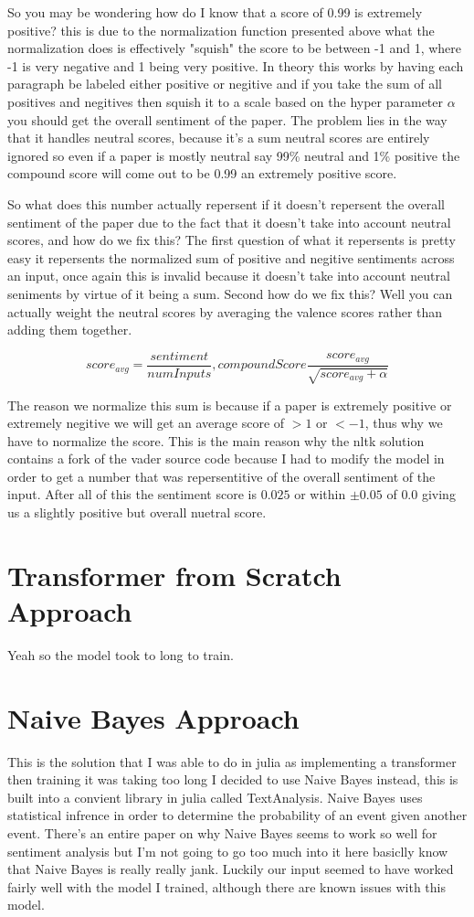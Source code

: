 \documentclass[12pt]{article}
\begin{document}
So you may be wondering how do I know that a score of 0.99 is extremely positive?
this is due to the normalization function presented above what the normalization
does is effectively "squish" the score to be between -1 and 1, where -1 is very 
negative and 1 being very positive. In theory this works by having each paragraph
be labeled either positive or negitive and if you take the sum of all positives and
negitives then squish it to a scale based on the hyper parameter $\alpha$ you
should get the overall sentiment of the paper. The problem lies in the way that it
handles neutral scores, because it's a sum neutral scores are entirely ignored
so even if a paper is mostly neutral say 99\% neutral and 1\% positive the compound
score will come out to be 0.99 an extremely positive score. 

So what does this number actually repersent
if it doesn't repersent the overall sentiment of the paper due to the fact
that it doesn't take into account
neutral scores, and how do we fix this? The first question of what it repersents
is pretty easy it repersents the normalized sum of positive and negitive sentiments 
across an input, once again this is invalid because it doesn't take into account
neutral seniments by virtue of it being a sum. Second how do we fix this? Well
you can actually weight the neutral scores by averaging the valence scores rather
than adding them together.

$$
score_{avg} = \frac{sentiment}{numInputs}, 
compoundScore\frac{score_{avg}}{\sqrt{score_{avg} + \alpha}}
$$

The reason we normalize this sum is because if a paper is extremely positive 
or extremely negitive we will get an average score of $>1$ or $<-1$, thus why we
have to normalize the score. This is the main reason why the nltk solution
contains a fork of the vader source code because I had to modify the model in order
to get a number that was repersentitive of the overall sentiment of the input.
After all of this the sentiment score is $0.025$ or within $\pm0.05$ of $0.0$ giving
us a slightly positive but overall nuetral score.

\newpage
\section{Transformer from Scratch Approach}
Yeah so the model took to long to train.

\newpage
\section{Naive Bayes Approach}
This is the solution that I was able to do in julia as implementing a transformer then training it was taking too long I decided
to use Naive Bayes instead, this is built into a convient library in julia called TextAnalysis. Naive Bayes uses statistical infrence 
in order to determine the probability of an event given another event. There's an entire paper on why Naive Bayes seems to work
so well for sentiment analysis but I'm not going to go too much into it here basiclly know that Naive Bayes is really 
really jank. Luckily our input seemed to have worked fairly well with the model I trained, although there are known issues with
this model.
\end{document}
